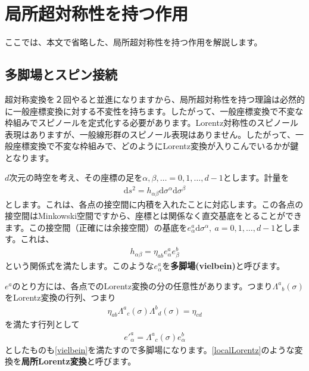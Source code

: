 \documentclass[report,paper=a4, fontsize=12pt, line_length=16cm, number_of_lines=34,dvipdfmx]{jlreq}
\numberwithin{equation}{chapter}
\numberwithin{equation}{section}
\newcommand{\kyou}[1]{{\sffamily \bfseries #1}}
\newcommand{\di}{\mathrm{d}}
\begin{document}
\appendix
\chapter{局所超対称性を持つ作用}
\label{app:localSUSY}
ここでは、本文で省略した、局所超対称性を持つ作用を解説します。

\section{多脚場とスピン接続}
超対称変換を２回やると並進になりますから、局所超対称性を持つ理論は必然的に一般座標変換に対する不変性を持ちます。したがって、一般座標変換で不変な枠組みでスピノールを定式化する必要があります。Lorentz対称性のスピノール表現はありますが、一般線形群のスピノール表現はありません。したがって、一般座標変換で不変な枠組みで、どのようにLorentz変換が入りこんでいるかが鍵となります。

$d$次元の時空を考え、その座標の足を$\alpha,\beta,\dots=0,1,\dots,d-1$とします。計量を
\begin{align}
  \di s^2 = h_{\alpha\beta} \di \sigma^{\alpha}\di \sigma^{\beta}
\end{align}
とします。これは、各点の接空間に内積を入れたことに対応します。この各点の接空間はMinkowski空間ですから、座標とは関係なく直交基底をとることができます。この接空間（正確には余接空間）の基底を$e^{a}_{\alpha}\di \sigma^{\alpha}, \ a=0,1,\dots,d-1$とします。これは、
\begin{align}
  h_{\alpha\beta}=\eta_{ab}e^{a}_{\alpha}e^{b}_{\beta}\label{vielbein}
\end{align}
という関係式を満たします。このような$e^{a}_{\alpha}$を\kyou{多脚場(vielbein)}と呼びます。

$e^{a}$のとり方には、各点でのLorentz変換の分の任意性があります。つまり$\Lambda^{a}{}_{b}(\sigma)$をLorentz変換の行列、つまり
\begin{align}
  \eta_{ab}\Lambda^{a}{}_{c}(\sigma)\Lambda^{b}{}_{d}(\sigma)=\eta_{cd}
\end{align}
を満たす行列として
\begin{align}
  e'^{a}_{\alpha}=\Lambda^{a}{}_{c}(\sigma)e^{b}_{\alpha}
  \label{localLorentz}
\end{align}
としたものも\eqref{vielbein}を満たすので多脚場になります。\eqref{localLorentz}のような変換を\kyou{局所Lorentz変換}と呼びます。
\end{document}
